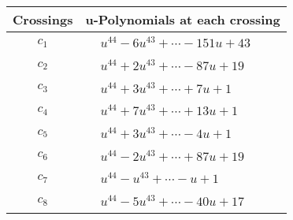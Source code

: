 \documentclass[1p]{elsarticle_modified}
\theoremstyle{definition}
\begin{document}
\begin{tabular}{m{50pt}|m{274pt}}
Crossings & \hspace{64pt}u-Polynomials at each crossing \\
\hline $$\begin{aligned}c_{1}\end{aligned}$$&$\begin{aligned}
&u^{44}-6 u^{43}+\cdots-151 u+43
\end{aligned}$\\
\hline $$\begin{aligned}c_{2}\end{aligned}$$&$\begin{aligned}
&u^{44}+2 u^{43}+\cdots-87 u+19
\end{aligned}$\\
\hline $$\begin{aligned}c_{3}\end{aligned}$$&$\begin{aligned}
&u^{44}+3 u^{43}+\cdots+7 u+1
\end{aligned}$\\
\hline $$\begin{aligned}c_{4}\end{aligned}$$&$\begin{aligned}
&u^{44}+7 u^{43}+\cdots+13 u+1
\end{aligned}$\\
\hline $$\begin{aligned}c_{5}\end{aligned}$$&$\begin{aligned}
&u^{44}+3 u^{43}+\cdots-4 u+1
\end{aligned}$\\
\hline $$\begin{aligned}c_{6}\end{aligned}$$&$\begin{aligned}
&u^{44}-2 u^{43}+\cdots+87 u+19
\end{aligned}$\\
\hline $$\begin{aligned}c_{7}\end{aligned}$$&$\begin{aligned}
&u^{44}- u^{43}+\cdots- u+1
\end{aligned}$\\
\hline $$\begin{aligned}c_{8}\end{aligned}$$&$\begin{aligned}
&u^{44}-5 u^{43}+\cdots-40 u+17
\end{aligned}$\\

\end{tabular}
\end{document}
